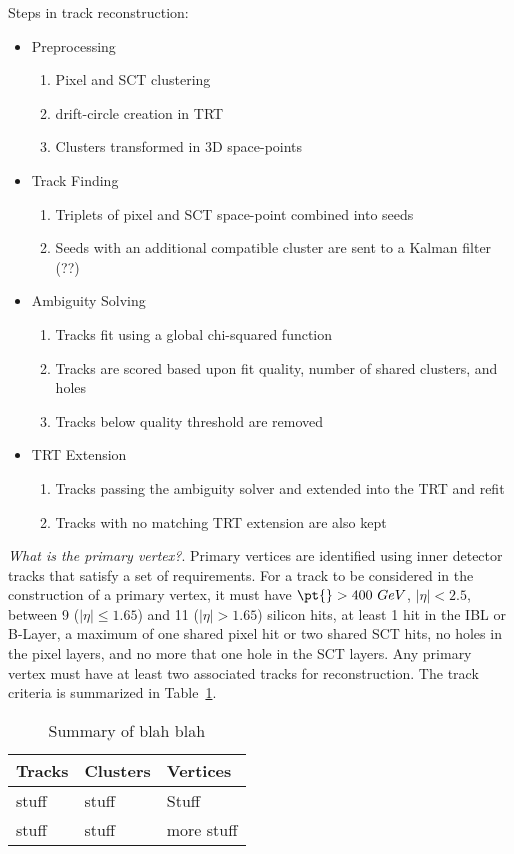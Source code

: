 Steps in track reconstruction: 
\begin{itemize}
\item Preprocessing  
\begin{enumerate}
\item Pixel and SCT clustering 
\item drift-circle creation in TRT
\item Clusters transformed in 3D space-points
\end{enumerate}
\item Track Finding 
\begin{enumerate}
\item Triplets of pixel and SCT space-point combined into seeds
\item Seeds with an additional compatible cluster are sent to a Kalman filter (??)
\end{enumerate}
\item Ambiguity Solving
\begin{enumerate}
\item Tracks fit using a global chi-squared function 
\item Tracks are scored based upon fit quality, number of shared clusters, and holes
\item Tracks below quality threshold are removed
\end{enumerate}
\item TRT Extension
\begin{enumerate}
\item Tracks passing the ambiguity solver and extended into the TRT and refit
\item Tracks with no matching TRT extension are also kept 
\end{enumerate}
\end{itemize}
\textit{What is the primary vertex?}. 
Primary vertices are identified using inner detector tracks that satisfy a set of requirements.  For a track to be considered in the construction of a primary vertex, it must have $ \pt{} > 400~GeV$, $|\eta| < 2.5$, between 9 ($|\eta| \leq 1.65$) and 11 ($|\eta| > 1.65$) silicon hits, at least 1 hit in the IBL or B-Layer, a maximum of one shared pixel hit or two shared SCT hits, no holes in the pixel layers, and no more that one hole in the SCT layers.  Any primary vertex must have at least two associated tracks for reconstruction.  The track criteria is summarized in Table~\ref{tab:trkclustervtx}.

\begin{table}[tbp]
  \centering
  \begin{tabular}{lll}
    \hline
 Tracks                             & Clusters & Vertices\\
 \hline
stuff  & stuff              &Stuff  \\
 \hline
 stuff                  & stuff               & more stuff  \\
 \hline
  \end{tabular}
  \caption{Summary of blah blah}
  \label{tab:trkclustervtx}
\end{table}

